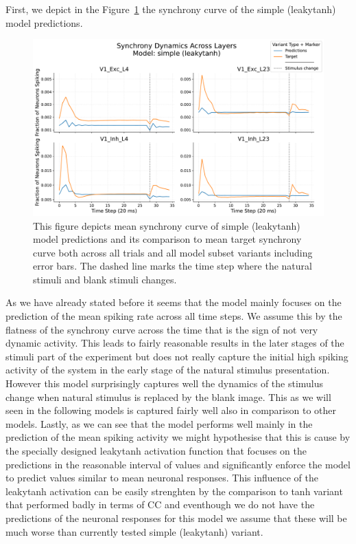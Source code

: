 First, we depict in the Figure~\ref{fig:synchrony_curve_simple_leaky_tanh} the synchrony curve of the simple (leakytanh) model predictions. 

\begin{figure}
    \centering
    \includegraphics[width=\linewidth]{img/plots/separate_model_synchrony_curve_simple_evaluation_new.pdf}
    \caption{This figure depicts mean synchrony curve of simple (leakytanh) model predictions and its comparison to mean target synchrony curve both across all trials and all model subset variants including error bars. The dashed line marks the time step where the natural stimuli and blank stimuli changes.}
    \label{fig:synchrony_curve_simple_leaky_tanh}
\end{figure}

As we have already stated before it seems that the model mainly focuses on the prediction of the mean spiking rate across all time steps. We assume this by the flatness of the synchrony curve across the time that is the sign of not very dynamic activity. This leads to fairly reasonable results in the later stages of the stimuli part of the experiment but does not really capture the initial high spiking activity of the system in the early stage of the natural stimulus presentation. However this model surprisingly captures well the dynamics of the stimulus change when natural stimulus is replaced by the blank image. This as we will seen in the following models is captured fairly well also in comparison to other models. Lastly, as we can see that the model performs well mainly in the prediction of the mean spiking activity we might hypothesise that this is cause by the specially designed leakytanh activation function that focuses on the predictions in the reasonable interval of values and significantly enforce the model to predict values similar to mean neuronal responses. This influence of the leakytanh activation can be easily strenghten by the comparison to tanh variant that performed badly in terms of CC and eventhough we do not have the predictions of the neuronal responses for this model we assume that these will be much worse than currently tested simple (leakytanh) variant.

